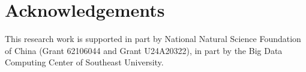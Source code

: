\documentclass[letterpaper]{article} %
\begin{document}
\section*{Acknowledgements}

  This research work is supported in part by National Natural Science Foundation of China (Grant 62106044 and Grant U24A20322), in part by the Big Data Computing Center of Southeast University.









\end{document}
